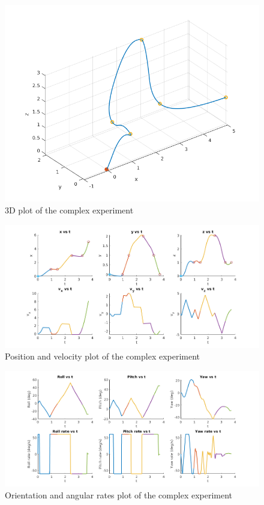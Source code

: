 \documentclass[letterpaper, 10 pt, conference]{ieeeconf}  %
\begin{document}
\begin{figure}[!htpb]
	\centering
	\includegraphics[width=1.0\linewidth]{Images/final_race/3d.png}
	\caption{3D plot of the complex experiment}
	\label{fig:final_3d}
\end{figure}
\begin{figure}[!htpb]
	\centering
	\includegraphics[width=1.0\linewidth]{Images/final_race/pos_vel.png}
	\caption{Position and velocity plot of the complex experiment}
	\label{fig:final_pos_vel}
\end{figure}
\begin{figure}[!htpb]
	\centering
	\includegraphics[width=1.0\linewidth]{Images/final_race/orient_rates.png}
	\caption{Orientation and angular rates plot of the complex experiment}
	\label{fig:final_orient_rates}
\end{figure}
\end{document}

